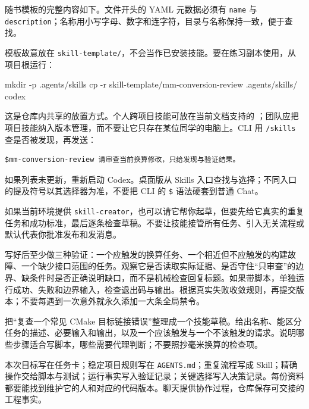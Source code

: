 \begin{example}
随书模板的完整内容如下。文件开头的 YAML 元数据必须有 \texttt{name} 与 \texttt{description}；名称用小写字母、数字和连字符，目录与名称保持一致，便于查找。

模板故意放在 \texttt{skill-template/}，不会当作已安装技能。要在练习副本使用，从项目根运行：
\begin{tbash}
mkdir -p .agents/skills
cp -r skill-template/mm-conversion-review .agents/skills/
codex
\end{tbash}
这是仓库内共享的放置方式。个人跨项目技能可放在当前文档支持的 ；团队应把项目技能纳入版本管理，而不要让它只存在某位同学的电脑上。CLI 用 \texttt{/skills} 查是否被发现，再发送：
\begin{lstlisting}[language={}]
$mm-conversion-review 请审查当前换算修改，只给发现与验证结果。
\end{lstlisting}
如果列表未更新，重新启动 Codex。桌面版从 Skills 入口查找与选择；不同入口的提及符号以其选择器为准，不要把 CLI 的 \texttt{\$} 语法硬套到普通 Chat。
\end{example}

如果当前环境提供 \texttt{skill-creator}，也可以请它帮你起草，但要先给它真实的重复任务和成功标准，最后逐条检查草稿。不要让技能接管所有任务、引入无关流程或默认代表你批准发布和发消息。

写好后至少做三种验证：一个应触发的换算任务、一个相近但不应触发的构建故障、一个缺少接口范围的任务。观察它是否读取实际证据、是否守住“只审查”的边界、缺条件时是否正确说明缺口，而不是机械检查回复标题。如果带脚本，单独运行成功、失败和边界输入，检查退出码与输出。根据真实失败收敛规则，再提交版本；不要每遇到一次意外就永久添加一大条全局禁令。

\begin{exercise}\label{ex:ai-skill}
把“复查一个常见 CMake 目标链接错误”整理成一个技能草稿。给出名称、能区分任务的描述、必要输入和输出，以及一个应该触发与一个不该触发的请求。说明哪些步骤适合写脚本，哪些需要代理判断；不要照抄毫米换算的检查项。
\end{exercise}

\begin{conclusion}
本次目标写在任务卡；稳定项目规则写在 \texttt{AGENTS.md}；重复流程写成 Skill；精确操作交给脚本与测试；运行事实写入验证记录；关键选择写入决策记录。每份资料都要能找到维护它的人和对应的代码版本。聊天提供协作过程，仓库保存可交接的工程事实。
\end{conclusion}

